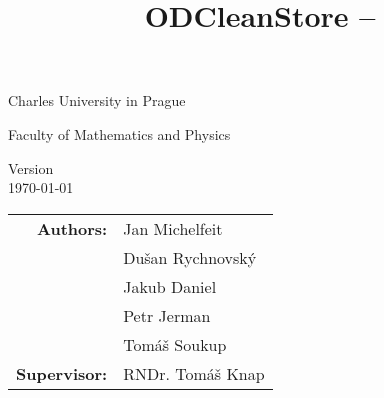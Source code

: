 \title{ODCleanStore -- \documentname}

\begin{titlepage}
\begin{center}

\large
Charles University in Prague

\smallskip

Faculty of Mathematics and Physics





\begin{spacing}{1.5} 
{\bf\Huge \documentname}
\end{spacing}

Version \version\\
\today


\begin{tabular}{rl}

\textbf{Authors:} & Jan Michelfeit \\
& Du\v san Rychnovsk\'y\\
& Jakub Daniel\\
& Petr Jerman\\
& Tom\' a\v s Soukup\\
\noalign{\vspace{3mm}}
\textbf{Supervisor:} & RNDr. Tom\' a\v s Knap
\end{tabular}

\end{center}
\end{titlepage}

\newpage